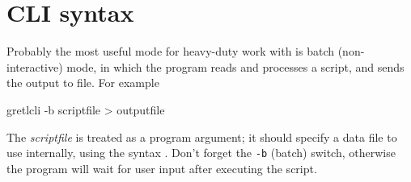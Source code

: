 \section{CLI syntax}
\label{cli-syntax}

Probably the most useful mode for heavy-duty work with 
is batch (non-interactive) mode, in which the program reads and
processes a script, and sends the output to file.  For example
\begin{code}
gretlcli -b scriptfile > outputfile
\end{code}

The \textsl{scriptfile} is treated as a program argument; it should
specify a data file to use internally, using the syntax .  Don't forget the \texttt{-b} (batch) switch, otherwise
the program will wait for user input after executing the script.

    

